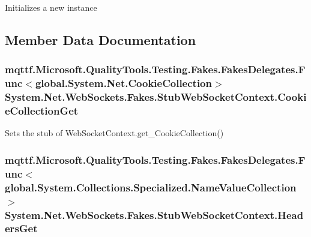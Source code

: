Initializes a new instance



\subsection{Member Data Documentation}
\hypertarget{class_system_1_1_net_1_1_web_sockets_1_1_fakes_1_1_stub_web_socket_context_ac8330a0a2c4435a592c2a986679094b6}{
\subsubsection[{Cookie\-Collection\-Get}]{\setlength{\rightskip}{0pt plus 5cm}mqttf.\-Microsoft.\-Quality\-Tools.\-Testing.\-Fakes.\-Fakes\-Delegates.\-Func$<$global.\-System.\-Net.\-Cookie\-Collection$>$ System.\-Net.\-Web\-Sockets.\-Fakes.\-Stub\-Web\-Socket\-Context.\-Cookie\-Collection\-Get}}\label{class_system_1_1_net_1_1_web_sockets_1_1_fakes_1_1_stub_web_socket_context_ac8330a0a2c4435a592c2a986679094b6}


Sets the stub of Web\-Socket\-Context.\-get\-\_\-\-Cookie\-Collection()

\hypertarget{class_system_1_1_net_1_1_web_sockets_1_1_fakes_1_1_stub_web_socket_context_aab7e582b3bf78057af177717bab5beca}{
\subsubsection[{Headers\-Get}]{\setlength{\rightskip}{0pt plus 5cm}mqttf.\-Microsoft.\-Quality\-Tools.\-Testing.\-Fakes.\-Fakes\-Delegates.\-Func$<$global.\-System.\-Collections.\-Specialized.\-Name\-Value\-Collection$>$ System.\-Net.\-Web\-Sockets.\-Fakes.\-Stub\-Web\-Socket\-Context.\-Headers\-Get}}\label{class_system_1_1_net_1_1_web_sockets_1_1_fakes_1_1_stub_web_socket_context_aab7e582b3bf78057af177717bab5beca}


